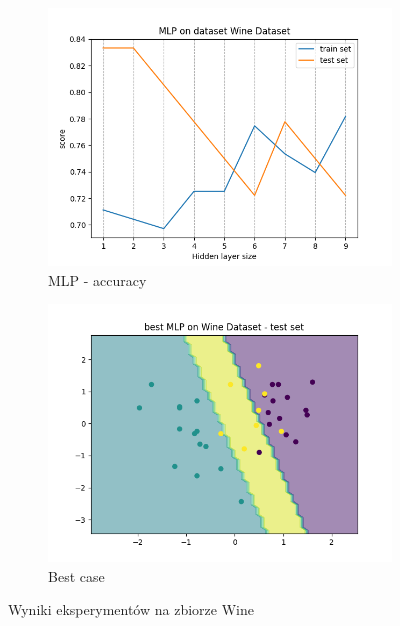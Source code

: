 \documentclass[12pt]{article}
\newcommand*{\subfigwidth}{0.24\textwidth}
\begin{document}
\begin{figure}[H]
\begin{subfigure}[t]{\subfigwidth}
        \includegraphics[width=\linewidth]{img/other_datasets/mlp/wine_accuracy.png}
        \caption{MLP - accuracy}
    \end{subfigure}
    \hfill
    \begin{subfigure}[t]{\subfigwidth}
        \includegraphics[width=\linewidth]{img/other_datasets/mlp/wine_best_boundary_test.png}
        \caption{Best case}
    \end{subfigure}
    \caption{Wyniki eksperymentów na zbiorze Wine}
\end{figure}
\end{document}

